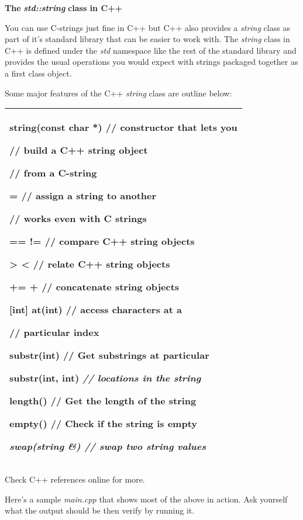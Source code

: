 \documentclass[
]{article}
\begin{document}
\textbf{The }\emph{\textbf{std::}\textbf{s}\textbf{tring}}\textbf{ class
in C++}

You can use C-strings just fine in C++ but C++ also provides a
\emph{string} class as part of it's standard library that can be easier
to work with. The \emph{string} class in C++ is defined under the
\emph{std} namespace like the rest of the standard library and provides
the usual operations you would expect with strings packaged together as
a first class object.

Some major features of the C++ \emph{string} class are outline below:

\begin{longtable}[]{@{}l@{}}
\toprule
\endhead
\begin{minipage}[t]{0.97\columnwidth}\raggedright
string(const char *) // constructor that lets you

// build a C++ string object

// from a C-string

= // assign a string to another

// works even with C strings

== != // compare C++ string objects

\textgreater{} \textless{} // relate C++ string objects

+= + // concatenate string objects

{[}int{]} at(int) // access characters at a

// particular index

substr(int) // Get substrings at particular

substr(int, int) \emph{ // locations in the string}

length() // Get the length of the string

empty() // Check if the string is empty

\emph{swap(string \&) // swap two string values}\strut
\end{minipage}\tabularnewline
\bottomrule
\end{longtable}

Check C++ references online for more.

Here's a sample \emph{main.cpp} that shows most of the above in action.
Ask yourself what the output should be then verify by running it.
\end{document}

